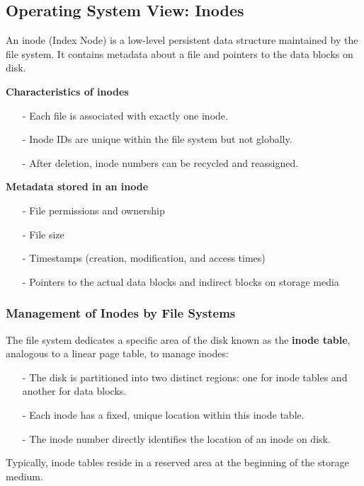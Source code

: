 \documentclass[../../compsys.tex]{subfiles}
\begin{document}
\subsection{Operating System View: Inodes}
\begin{definition}[Inode]
  An inode (Index Node) is a low-level persistent data structure maintained by the file system. It contains metadata about a file and pointers to the data blocks on disk. \\[5px]
\end{definition}
\noindent
\begin{minipage}[htp]{0.45\textwidth}
\textbf{Characteristics of inodes}
\begin{itemize}
    \item[-] Each file is associated with exactly one inode.
    \item[-] Inode IDs are unique within the file system but not globally.
    \item[-] After deletion, inode numbers can be recycled and reassigned.
\end{itemize}
\end{minipage}%
\hfill
\vline
\hfill
\begin{minipage}[htp]{0.45\textwidth}
\textbf{Metadata stored in an inode}
\begin{itemize}[itemsep=3pt, topsep=1pt]
  \item[-] File permissions and ownership
  \item[-] File size
  \item[-] Timestamps (creation, modification, and access times)
  \item[-] Pointers to the actual data blocks and indirect blocks on storage media
\end{itemize}
\end{minipage}

\subsubsection{Management of Inodes by File Systems}
The file system dedicates a specific area of the disk known as the \textbf{inode table}, analogous to a linear page table, to manage inodes:
\begin{itemize}[itemsep=3pt, topsep=1pt]
  \item[-] The disk is partitioned into two distinct regions: one for inode tables and another for data blocks.
  \item[-] Each inode has a fixed, unique location within this inode table.
  \item[-] The inode number directly identifies the location of an inode on disk.
\end{itemize}
Typically, inode tables reside in a reserved area at the beginning of the storage medium.
\newpage
\end{document}
